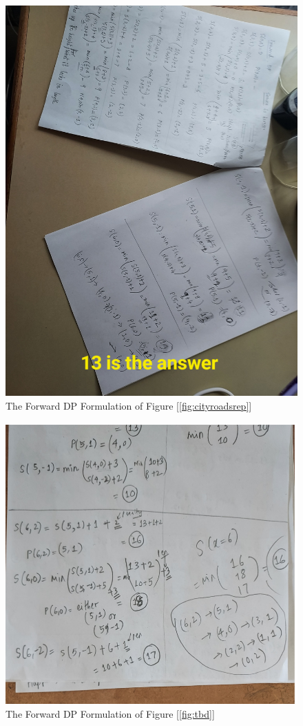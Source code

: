 \documentclass[english,notitlepage,smartquotes]{hgbreport}
\theoremstyle{definition}
\theoremstyle{definition}
\theoremstyle{remark}
\theoremstyle{definition}
\theoremstyle{plain}
\theoremstyle{definition}
\begin{document}
\begin{figure}[H]
\centering
\includegraphics[width=.5\textwidth]{forward-dp-sol}
\caption{The Forward DP Formulation of Figure [\ref{fig:cityroadsrep}]}
\label{fig:forwarddpsol1}
\end{figure}

\begin{figure}[H]
\centering
\includegraphics[width=.5\textwidth,angle=-90]{forward-dp-p1.6}
\caption{The Forward DP Formulation of Figure [\ref{fig:tbd}]}
\label{fig:forwarddpsol1}
\end{figure}

\MakeBibliography[nosplit]

\end{document}

